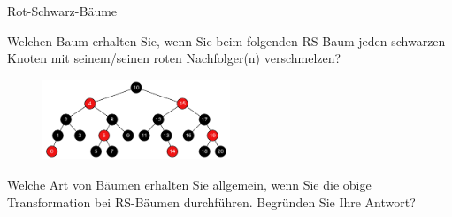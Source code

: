 \documentclass[11pt,a4paper]{article}
\begin{document}
\begin{aufgabe}{2}{Rot-Schwarz-Bäume}
\begin{enumerate}
        Welchen Baum erhalten Sie, wenn Sie beim folgenden RS-Baum jeden schwarzen Knoten mit seinem/seinen roten Nachfolger(n) verschmelzen?
        \begin{figure}[h!]
            \centering
            \includegraphics[width=0.5\textwidth]{img/2d}
        \end{figure}
        \FloatBarrier
        Welche Art von Bäumen erhalten Sie allgemein, wenn Sie die obige Transformation bei RS-Bäumen durchführen.
        Begründen Sie Ihre Antwort?
    \end{enumerate}
    
\end{aufgabe}
\end{document}
